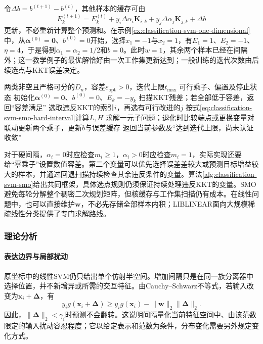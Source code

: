 令$\Delta b=b^{(t+1)}-b^{(t)}$，其他样本的缓存可由
\[
  E_k^{(t+1)}
  =E_k^{(t)}
   +y_i\Delta\alpha_i\bm{K}_{i,k}
   +y_j\Delta\alpha_j\bm{K}_{j,k}
   +\Delta b
\]
更新，不必重新计算整个预测和。在示例\ref{ex:classification-svm-one-dimensional}中，从$\bm{\alpha}^{(0)}=\bm{0}$、$b^{(0)}=0$开始，选择$x_1=-1$与$x_2=1$，有$E_1=1$、$E_2=-1$、$\eta=4$，于是得到$\alpha_1=\alpha_2=1/2$和$b=0$。此时$w=1$，其余两个样本已经在间隔外；这一教学例子的最优解恰好由一次工作集更新达到；一般训练的迭代次数由后续选点与KKT误差决定。

\begin{algorithm}[硬间隔SMO的训练框架]
  \label{alg:classification-svm-smo}
  \begin{algorithmic}[1]
    \Require 两类非空且严格可分的$D_n$，容差$\varepsilon_{\mathrm{opt}}>0$，迭代上限$t_{\max}$
    \Ensure 可行乘子、偏置及停止状态
    \State 初始化$\bm{\alpha}^{(0)}=\bm{0}$、$b^{(0)}=0$、$E_k=-y_k$
      \State 扫描KKT残差；若全部低于容差，返回“容差满足”
      \State 选取违反KKT的索引$i$，再选有可行改进的$j$
      \State 按式\eqref{eq:classification-svm-smo-hard-interval}计算$L,H$
      \State 求解一元子问题；退化时比较端点或更换变量对
      \State 联动更新两个乘子，更新$b$与误差缓存
    \EndFor
    \State 返回当前参数及“达到迭代上限，尚未认证收敛”
  \end{algorithmic}
\end{algorithm}

对于硬间隔，$\alpha_i=0$时应检查$m_i\ge1$，$\alpha_i>0$时应检查$m_i=1$，实际实现还要给“零乘子”设置数值容差。第二个变量可以优先选择误差差较大或预测目标增益较大的样本，并通过回退扫描持续检查其余违反条件的变量。算法\ref{alg:classification-svm-smo}给出共同框架，具体选点规则仍须保证持续处理违反KKT的变量。SMO避免每轮分解整个稠密二次规划矩阵，但核缓存与工作集扫描仍有成本。在线性问题中，也可以直接维护$\bm{w}$，不必先存储全部样本内积；LIBLINEAR面向大规模稀疏线性分类提供了专门求解路线。

\subsubsection{理论分析}
\label{sec:classification-svm-analysis}

\paragraph{表达边界与局部扰动}
原坐标中的线性SVM仍只给出单个仿射半空间。增加间隔只是在同一族分离器中选择位置，并不新增异或所需的交互特征。由Cauchy--Schwarz不等式，若输入改变为$\bm{x}_i+\bm{\Delta}$，有
\[
  y_i g(\bm{x}_i+\bm{\Delta})
  \ge y_i g(\bm{x}_i)
      -\lVert\bm{w}\rVert_2\lVert\bm{\Delta}\rVert_2.
\]
因此，$\lVert\bm{\Delta}\rVert_2<\gamma_i$时预测不会翻转。这说明间隔量化当前特征空间中、由该范数限定的输入扰动容忍程度；它以给定表示和范数为条件，分布变化需要另外规定变化方式。

